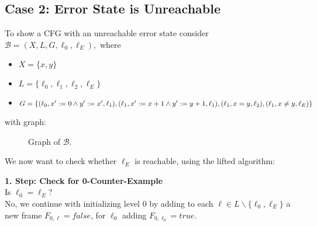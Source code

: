 \documentclass[11pt, a4paper, BCOR=10mm, ngerman]{scrbook}
\begin{document}
\pagebreak

\subsection{Case 2: Error State is Unreachable}
To show a CFG with an unreachable error state consider $\mathcal{B} = (X, L, G, \ell_0, \ell_E),$ where
\begin{itemize}
\item $X = \{x, y\}$
\item $L = \{\ell_0, \ell_1, \ell_2, \ell_E\}$
\item $G = \{(\ell_0, x' := 0 \land y' := x', \ell_1), (\ell_1, x' := x+1 \land y' := y+1, \ell_1),\\ (\ell_1, x = y, \ell_2), (\ell_1, x \neq y, \ell_E) \}$
\end{itemize}

with graph: \\


\begin{figure}[H]
\centering
\hspace*{3cm}
  \caption{Graph of $\mathcal{B}$.}
 \end{figure}
 \label{ex1} 

We now want to check whether $\ell_E$ is reachable, using the lifted algorithm: \par

\textbf{1. Step: Check for 0-Counter-Example} \\
Is $\ell_0 = \ell_E$? \\
No, we continue with initializing level 0 by adding to each $\ell \in L \backslash \{\ell_0, \ell_E\}$ a new frame $F_{0, \ell} = false$, for $\ell_0$ adding $F_{0, \ell_0} = true$. \\ \\
\end{document}
